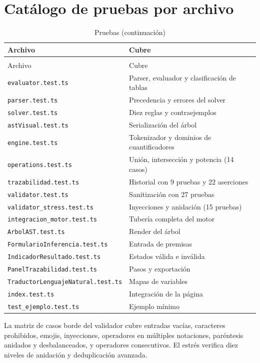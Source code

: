 \documentclass[11pt,a4paper,openany]{book}
\begin{document}
\chapter{Cat\'alogo de pruebas por archivo}
\label{ch:tests-cat}
\begin{longtable}{ll}
\caption{Archivos de prueba y cobertura} \\
\toprule
Archivo & Cubre \\
\midrule
\endfirsthead
\caption{Pruebas (continuaci\'on)} \\
\toprule
Archivo & Cubre \\
\midrule
\endhead
\texttt{evaluator.test.ts} & Parser, evaluador y clasificaci\'on de tablas \\
\texttt{parser.test.ts} & Precedencia y errores del solver \\
\texttt{solver.test.ts} & Diez reglas y contraejemplos \\
\texttt{astVisual.test.ts} & Serializaci\'on del \'arbol \\
\texttt{engine.test.ts} & Tokenizador y dominios de cuantificadores \\
\texttt{operations.test.ts} & Uni\'on, intersecci\'on y potencia (14 casos) \\
\texttt{trazabilidad.test.ts} & Historial con 9 pruebas y 22 aserciones \\
\texttt{validator.test.ts} & Sanitizaci\'on con 27 pruebas \\
\texttt{validator\_stress.test.ts} & Inyecciones y anidaci\'on (15 pruebas) \\
\texttt{integracion\_motor.test.ts} & Tuber\'ia completa del motor \\
\texttt{ArbolAST.test.ts} & Render del \'arbol \\
\texttt{FormularioInferencia.test.ts} & Entrada de premisas \\
\texttt{IndicadorResultado.test.ts} & Estados v\'alida e inv\'alida \\
\texttt{PanelTrazabilidad.test.ts} & Pasos y exportaci\'on \\
\texttt{TraductorLenguajeNatural.test.ts} & Mapas de variables \\
\texttt{index.test.ts} & Integraci\'on de la p\'agina \\
\texttt{test\_ejemplo.test.ts} & Ejemplo m\'inimo \\
\bottomrule
\end{longtable}
La matriz de casos borde del validador cubre entradas vac\'ias, caracteres prohibidos, emojis, inyecciones, operadores en m\'ultiples notaciones, par\'entesis anidados y desbalanceados, y operadores consecutivos. El estr\'es verifica diez niveles de anidaci\'on y deduplicaci\'on avanzada.
\end{document}
